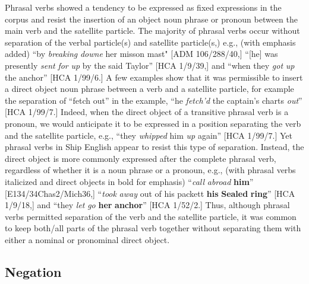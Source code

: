   Phrasal verbs showed a tendency to be expressed as fixed expressions in the corpus and resist the insertion of an object noun phrase or pronoun between the main verb and the satellite particle. The majority of phrasal verbs occur without separation of the verbal particle(s) and satellite particle(s,) e.g., (with emphasis added) “by \textit{breaking} \textit{downe} her misson mast" [ADM 106/288/40,] “[he] was presently \textit{sent} \textit{for} \textit{up} by the said Taylor” [HCA 1/9/39,] and “when they \textit{got} \textit{up} the anchor” [HCA 1/99/6.] A few examples show that it was permissible to insert a direct object noun phrase between a verb and a satellite particle, for example the separation of “fetch out” in the example, “he \textit{fetch’d} the captain’s charts \textit{out}” [HCA 1/99/7.] Indeed, when the direct object of a transitive phrasal verb is a pronoun, we would anticipate it to be expressed in a position separating the verb and the satellite particle, e.g., “they \textit{whipped} him \textit{up} again” [HCA 1/99/7.] Yet phrasal verbs in Ship English appear to resist this type of separation. Instead, the direct object is more commonly expressed after the complete phrasal verb, regardless of whether it is a noun phrase or a pronoun, e.g., (with phrasal verbs italicized and direct objects in bold for emphasis) “\textit{call} \textit{abroad} \textbf{him}” [E134/34Chas2/Mich36,] “\textit{took} \textit{away} out of his packett \textbf{his} \textbf{Sealed} \textbf{ring}” [HCA 1/9/18,] and “they \textit{let} \textit{go} \textbf{her} \textbf{anchor}” [HCA 1/52/2.] Thus, although phrasal verbs permitted separation of the verb and the satellite particle, it was common to keep both/all parts of the phrasal verb together without separating them with either a nominal or pronominal direct object. 

\subsection{\textbf{Negation}}%

